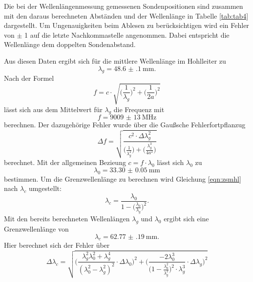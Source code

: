 Die bei der Wellenlängenmessung gemessenen Sondenpositionen sind zusammen mit den daraus berechneten Abständen
und der Wellenlänge in Tabelle \ref{tab:tab4} dargestellt. Um Ungenauigkeiten beim Ablesen zu berücksichtigen wird ein
Fehler von $\pm$ 1 auf die letzte Nachkommastelle angenommen. Dabei entspricht die Wellenlänge dem doppelten
Sondenabstand.

Aus diesen Daten ergibt sich für die mittlere Wellenlänge im Hohlleiter zu
\begin{equation}
  \lambda_g = \SI{48.6(1)}{\mm}.
\end{equation}
Nach der Formel
\begin{equation}
  f=c\cdot\sqrt{\Big(\frac{1}{\lambda_g}\Big)^2 + \Big(\frac{1}{2a}\Big)^2}
\end{equation}
lässt sich aus dem Mittelwert für $\lambda_g$ die Frequenz mit
\begin{equation}
  f=\SI{9009(13)}{\MHz}
\end{equation}
berechnen. Der dazugehörige Fehler wurde über die Gaußsche Fehlerfortpflanzug
\begin{equation}
  \Delta f=\sqrt{\frac{c^2\cdot\Delta \lambda^2_g}{\Big(\frac{1}{\lambda^2_g}\Big)+\Big(\frac{\lambda^3_g}{4a^2}\Big)}}
\end{equation}
berechnet.
Mit der allgemeinen Bezieung $c=f\cdot\lambda_0$ lässt sich $\lambda_0$ zu
\begin{equation}
  \lambda_0=\SI{33.30(5)}{\mm}
\end{equation}
bestimmen. Um die Grenzwellenlänge zu berechnen wird Gleichung \ref{eqn:zsmhl} nach $\lambda_c$ umgestellt:
\begin{equation}
  \lambda_c=\frac{\lambda_0}{1-\Big(\frac{\lambda_0}{\lambda_g}\Big)^2}.
\end{equation}
Mit den bereits berechneten Wellenlängen $\lambda_g$ und $\lambda_0$ ergibt sich eine Grenzwellenlänge von
\begin{equation}
  \lambda_c=\SI{62.77(19)}{\mm}.
\end{equation}
Hier berechnet sich der Fehler über
\begin{equation}
  \Delta\lambda_c=\sqrt{\Bigg(\frac{\lambda^2_g\lambda^2_0 + \lambda^4_g}{(\lambda^2_0-\lambda^2_g)^2}\cdot\Delta\lambda_0\Bigg)^2+
  \Bigg(\frac{-2\lambda^3_0}{\Big(1-\frac{\lambda^2_0}{\lambda^2_g}\Big)^2\cdot\lambda^3_g}\cdot\Delta\lambda_g\Bigg)^2}
\end{equation}

